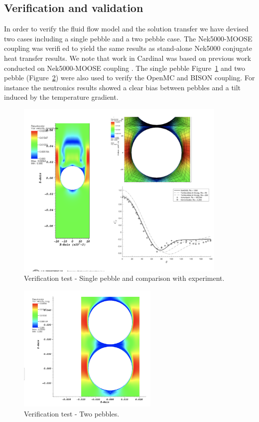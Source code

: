 \subsection{Verification and validation}
\label{ss:c3}

In order to verify the fluid flow model and the solution transfer we have devised two cases including a single pebble and a two pebble case. The Nek5000-MOOSE coupling was verified to yield the same results as
stand-alone Nek5000 conjugate heat transfer results. We note that work in Cardinal was based on previous
work conducted on Nek5000-MOOSE coupling \cite{novak2018preliminary}. The single pebble Figure~\ref{f:pb1} and two pebble (Figure~\ref{f:pb2}) were also used to verify the OpenMC and BISON coupling. For instance the neutronics results showed a clear bias between pebbles and a tilt induced by the temperature gradient.

\begin{figure}[!h]
\centering
\includegraphics[clip=true,width=0.9\textwidth]{Figures/pb_vv1}
\caption{Verification test - Single pebble and comparison with experiment.}
\label{f:pb1}
\end{figure}

\begin{figure}[!h]
\centering
\includegraphics[clip=true,width=0.6\textwidth]{Figures/pb_vv2}
\caption{Verification test - Two pebbles.}
\label{f:pb2}
\end{figure}

